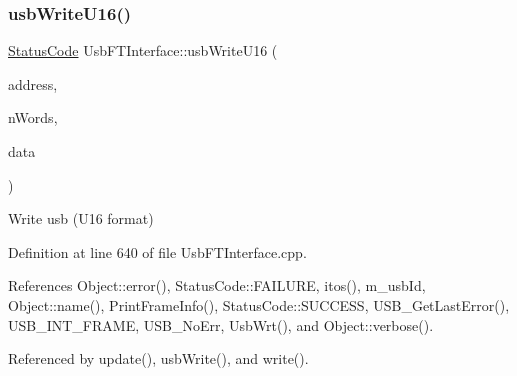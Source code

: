 \subsubsection{\texorpdfstring{usb\+Write\+U16()}{usbWriteU16()}}
{\footnotesize\ttfamily \hyperlink{classStatusCode}{Status\+Code} Usb\+F\+T\+Interface\+::usb\+Write\+U16 (\begin{DoxyParamCaption}\item[{unsigned long int}]{address,  }\item[{unsigned long int}]{n\+Words,  }\item[{unsigned short $\ast$}]{data }\end{DoxyParamCaption})}

Write usb (U16 format) 

Definition at line 640 of file Usb\+F\+T\+Interface.\+cpp.



References Object\+::error(), Status\+Code\+::\+F\+A\+I\+L\+U\+RE, itos(), m\+\_\+usb\+Id, Object\+::name(), Print\+Frame\+Info(), Status\+Code\+::\+S\+U\+C\+C\+E\+SS, U\+S\+B\+\_\+\+Get\+Last\+Error(), U\+S\+B\+\_\+\+I\+N\+T\+\_\+\+F\+R\+A\+ME, U\+S\+B\+\_\+\+No\+Err, Usb\+Wrt(), and Object\+::verbose().



Referenced by update(), usb\+Write(), and write().


